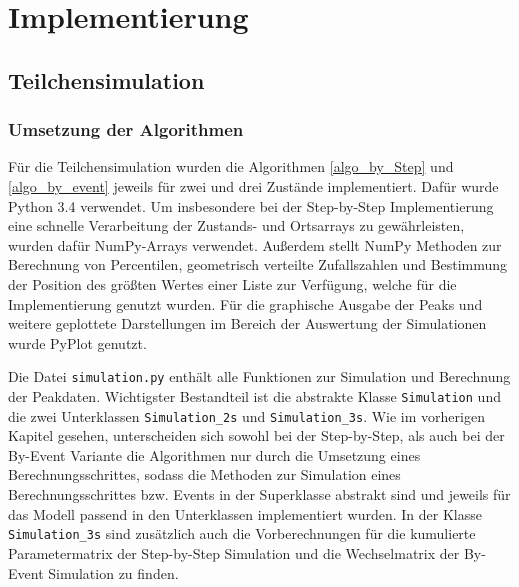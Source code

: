 \chapter{Implementierung}
\label{chapter:imp}

\section{Teilchensimulation}

\subsection{Umsetzung der Algorithmen}
Für die Teilchensimulation wurden die Algorithmen \ref{algo_by_Step} und \ref{algo_by_event} jeweils für zwei und drei Zustände implementiert. Dafür wurde Python 3.4 verwendet. 
Um insbesondere bei der Step-by-Step Implementierung eine schnelle Verarbeitung der Zustands- und Ortsarrays zu gewährleisten, wurden dafür NumPy-Arrays verwendet. Außerdem stellt NumPy Methoden zur Berechnung von Percentilen, geometrisch verteilte Zufallszahlen und Bestimmung der Position des größten Wertes einer Liste zur Verfügung, welche für die Implementierung genutzt wurden.
Für die graphische Ausgabe der Peaks und weitere geplottete Darstellungen im Bereich der Auswertung der Simulationen wurde PyPlot genutzt.


Die Datei \texttt{simulation.py} enthält alle Funktionen zur Simulation und Berechnung der Peakdaten. Wichtigster Bestandteil ist die abstrakte Klasse \texttt{Simulation} und die zwei Unterklassen \texttt{Simulation\_2s} und \texttt{Simulation\_3s}. Wie im vorherigen Kapitel gesehen, unterscheiden sich sowohl bei der Step-by-Step, als auch bei der By-Event Variante die Algorithmen nur durch die Umsetzung eines Berechnungsschrittes, sodass die Methoden zur Simulation eines Berechnungsschrittes bzw. Events in der Superklasse abstrakt sind und jeweils für das Modell passend in den Unterklassen implementiert wurden. In der Klasse \verb!Simulation_3s! sind zusätzlich auch die Vorberechnungen für die kumulierte Parametermatrix der Step-by-Step Simulation und die Wechselmatrix der By-Event Simulation zu finden.

